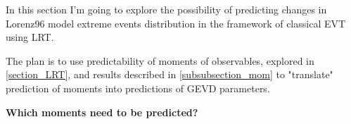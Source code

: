 \documentclass{article}
\begin{document}
In this section I'm going to explore the possibility of predicting changes in Lorenz96 model extreme events distribution in the framework of classical EVT using LRT.

The plan is to use predictability of moments of observables, explored in \ref{section_LRT}, and results described in \ref{subsubsection_mom} to "translate" prediction of moments into predictions of GEVD parameters.

\textbf{Which moments need to be predicted?}



\clearpage



\end{document}
